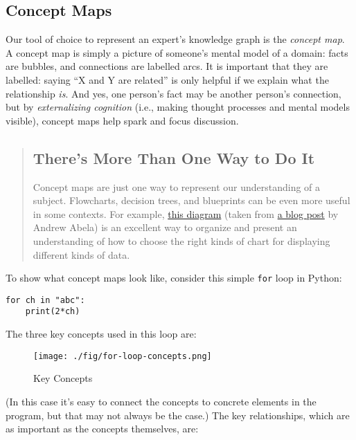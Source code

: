 \subsection*{Concept Maps}

Our tool of choice to represent an expert's knowledge graph is the \emph{concept map}.
A concept map is simply a picture of someone's mental model of a domain:
facts are bubbles,
and connections are labelled arcs.
It is important that they are labelled:
saying ``X and Y are related'' is only helpful if we explain what the relationship \emph{is}.
And yes,
one person's fact may be another person's connection,
but by \emph{externalizing cognition}
(i.e., making thought processes and mental models visible),
concept maps help spark and focus discussion.

\begin{quotation}   %
\subsection*{There's More Than One Way to Do It}

Concept maps are just one way to represent our understanding of a subject.
Flowcharts, decision trees, and blueprints can be even more useful in some contexts.
For example,
\href{\{\{ page.root \}\}/files/choosing-a-good-chart-09.pdf}{this diagram}
(taken from \href{http://extremepresentation.typepad.com/blog/2006/09/choosing\_a\_good.html}{a blog post} by Andrew Abela)
is an excellent way to organize and present an understanding of how to choose
the right kinds of chart for displaying different kinds of data.
\end{quotation}   %

To show what concept maps look like,
consider this simple \texttt{for} loop in Python:

\begin{verbatim}for ch in "abc":
    print(2*ch)
\end{verbatim}

The three key concepts used in this loop are:

\begin{figure}
\begin{center}
\texttt{[image: ./fig/for-loop-concepts.png]}
\end{center}
\caption{Key Concepts}

\end{figure}

(In this case it's easy to connect the concepts to concrete elements in the program,
but that may not always be the case.)
The key relationships,
which are as important as the concepts themselves,
are:

